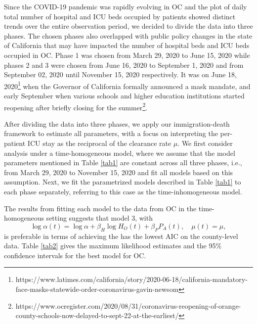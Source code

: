 \documentclass{article}
\newcommand{\achal}[1]{{\color{black}{ #1}}}
\begin{document}
Since the COVID-19 pandemic was rapidly evolving in OC and the plot of daily total number of hospital and ICU beds occupied by patients showed distinct trends over the entire observation period, we decided to divide the data into three phases. The chosen phases also overlapped with public policy changes in the state of California that may have impacted the number of hospital beds and ICU beds occupied in OC. Phase 1 was chosen from March 29, 2020 to June 15, 2020 while phases 2 and 3 were chosen from June 16, 2020 to September 1, 2020 and from September 02, 2020 until November 15, 2020 respectively. It was on June 18, 2020\footnote{https://www.latimes.com/california/story/2020-06-18/california-mandatory-face-masks-statewide-order-coronavirus-gavin-newsom} when the Governor of California formally announced a mask mandate, and early September when various schools and higher education institutions started reopening after briefly closing for the summer\footnote{https://www.ocregister.com/2020/08/31/coronavirus-reopening-of-orange-county-schools-now-delayed-to-sept-22-at-the-earliest/}. \par

After dividing the data into three phases, we apply our immigration-death framework to estimate all parameters, with a focus on interpreting the per-patient ICU stay as the reciprocal of the clearance rate $\mu$. We first consider analysis under a time-homogeneous model, where we assume that the model parameters mentioned in Table \ref{tab1} are constant across all three phases, i.e., from March 29, 2020 to November 15, 2020 and fit all models based on this assumption.\achal{The constant clearance rate assumption may not be realistic for OC data as suggested by our analysis, but provides a useful baseline comparison that illustrates the advantages of our framework in applying beyond the rigid case of a fixed clearance rate throughout the outbreak.} Next, we fit the parametrized models described in Table \ref{tab1} to each phase separately, referring to this case as the time-inhomogeneous model. \par

The results from fitting each model to the data from OC in the time-homogeneous setting suggests that model 3, with 
$$\log{\alpha(t)} = \log{\alpha} + \beta_{H} \log{H_{O}(t)} + \beta_{P}P_{A}(t), \quad \mu(t) = \mu,$$
is preferable in terms of achieving the has the lowest AIC on the county-level data. Table \ref{tab2} gives the maximum likelihood estimates and the 95\% confidence intervals for the best model for OC. \par
\end{document}
